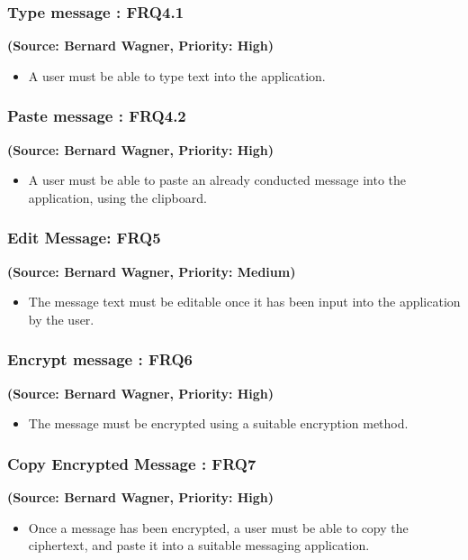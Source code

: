 \subsubsection{Type message : FRQ4.1}
\textbf{(Source: Bernard Wagner, Priority: High)}
\begin{itemize}
\item A user must be able to type text into the application.
\end{itemize}
\subsubsection{Paste message : FRQ4.2}
\textbf{(Source: Bernard Wagner, Priority: High)}
\begin{itemize}
\item A user must be able to paste an already conducted message into the application, using the clipboard.
\end{itemize}
\subsubsection{Edit Message: FRQ5}
\textbf{(Source: Bernard Wagner, Priority: Medium)}
\begin{itemize}
\item The message text must be editable once it has been input into the application by the user.
\end{itemize}
\subsubsection{Encrypt message : FRQ6}
\textbf{(Source: Bernard Wagner, Priority: High)}
\begin{itemize}
\item The message must be encrypted using a suitable encryption method.
\end{itemize}
\subsubsection{Copy Encrypted Message : FRQ7}
\textbf{(Source: Bernard Wagner, Priority: High)}
\begin{itemize}
\item Once a message has been encrypted, a user must be able to copy the ciphertext, and paste it into a suitable messaging application.
\end{itemize}
